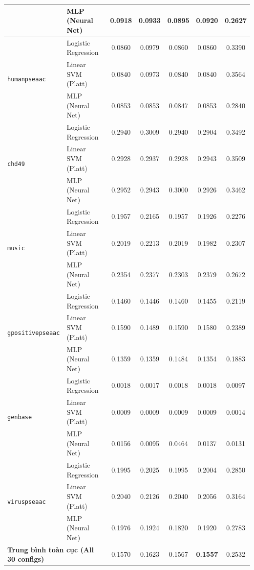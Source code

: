 \documentclass[10pt,a4paper,twoside]{article}
\begin{document}
\begin{table}[H]
{\begin{tabular}{llccccc}
 & MLP (Neural Net) & 0.0918 & 0.0933 & 0.0895 & 0.0920 & 0.2627 \\
\midrule
\multirow{3}{*}{\texttt{humanpseaac}} & Logistic Regression & 0.0860 & 0.0979 & 0.0860 & 0.0860 & 0.3390 \\
 & Linear SVM (Platt) & 0.0840 & 0.0973 & 0.0840 & 0.0840 & 0.3564 \\
 & MLP (Neural Net) & 0.0853 & 0.0853 & 0.0847 & 0.0853 & 0.2840 \\
\midrule
\multirow{3}{*}{\texttt{chd49}} & Logistic Regression & 0.2940 & 0.3009 & 0.2940 & 0.2904 & 0.3492 \\
 & Linear SVM (Platt) & 0.2928 & 0.2937 & 0.2928 & 0.2943 & 0.3509 \\
 & MLP (Neural Net) & 0.2952 & 0.2943 & 0.3000 & 0.2926 & 0.3462 \\
\midrule
\multirow{3}{*}{\texttt{music}} & Logistic Regression & 0.1957 & 0.2165 & 0.1957 & 0.1926 & 0.2276 \\
 & Linear SVM (Platt) & 0.2019 & 0.2213 & 0.2019 & 0.1982 & 0.2307 \\
 & MLP (Neural Net) & 0.2354 & 0.2377 & 0.2303 & 0.2379 & 0.2672 \\
\midrule
\multirow{3}{*}{\texttt{gpositivepseaac}} & Logistic Regression & 0.1460 & 0.1446 & 0.1460 & 0.1455 & 0.2119 \\
 & Linear SVM (Platt) & 0.1590 & 0.1489 & 0.1590 & 0.1580 & 0.2389 \\
 & MLP (Neural Net) & 0.1359 & 0.1359 & 0.1484 & 0.1354 & 0.1883 \\
\midrule
\multirow{3}{*}{\texttt{genbase}} & Logistic Regression & 0.0018 & 0.0017 & 0.0018 & 0.0018 & 0.0097 \\
 & Linear SVM (Platt) & 0.0009 & 0.0009 & 0.0009 & 0.0009 & 0.0014 \\
 & MLP (Neural Net) & 0.0156 & 0.0095 & 0.0464 & 0.0137 & 0.0131 \\
\midrule
\multirow{3}{*}{\texttt{viruspseaac}} & Logistic Regression & 0.1995 & 0.2025 & 0.1995 & 0.2004 & 0.2850 \\
 & Linear SVM (Platt) & 0.2040 & 0.2126 & 0.2040 & 0.2056 & 0.3164 \\
 & MLP (Neural Net) & 0.1976 & 0.1924 & 0.1820 & 0.1920 & 0.2783 \\
\midrule
\multicolumn{2}{l}{\textbf{Trung bình toàn cục (All 30 configs)}} & 0.1570 & 0.1623 & 0.1567 & \textbf{0.1557} & 0.2532 \\
\bottomrule
\end{tabular}%
}
\end{table}
\end{document}
